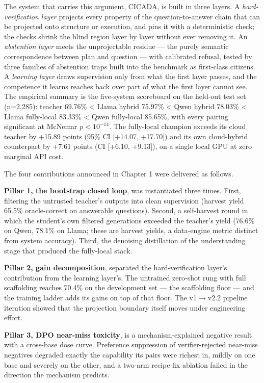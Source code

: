 \documentclass[10pt]{article} %
\begin{document}
The system that carries this argument, CICADA, is built in three layers. A \emph{hard-verification layer} projects every property of the question-to-answer chain that can be projected onto structure or execution, and pins it with a deterministic check; the checks shrink the blind region layer by layer without ever removing it. An \emph{abstention layer} meets the unprojectable residue --- the purely semantic correspondence between plan and question --- with calibrated refusal, tested by three families of abstention traps built into the benchmark as first-class citizens. A \emph{learning layer} draws supervision only from what the first layer passes, and the competence it learns reaches back over part of what the first layer cannot see. The empirical summary is the five-system scoreboard on the held-out test set (n=2,285): teacher 69.76\% < Llama hybrid 75.97\% < Qwen hybrid 78.03\% < Llama fully-local 83.33\% < Qwen fully-local 85.65\%, with every pairing significant at McNemar $p<10^{-14}$. The fully-local champion exceeds its cloud teacher by +15.89 points (95\% CI [+14.07, +17.70]) and its own cloud-hybrid counterpart by +7.61 points (CI [+6.10, +9.13]), on a single local GPU at zero marginal API cost.

The four contributions announced in Chapter 1 were delivered as follows.

\textbf{Pillar 1, the bootstrap closed loop}, was instantiated three times. First, filtering the untrusted teacher's outputs into clean supervision (harvest yield 65.5\% oracle-correct on answerable questions). Second, a self-harvest round in which the student's own filtered generations exceeded the teacher's yield (76.6\% on Qwen, 78.1\% on Llama; these are harvest yields, a data-engine metric distinct from system accuracy). Third, the denoising distillation of the understanding stage that produced the fully-local stack.

\textbf{Pillar 2, gain decomposition}, separated the hard-verification layer's contribution from the learning layer's. The untrained zero-shot rung with full scaffolding reaches 70.4\% on the development set --- the scaffolding floor --- and the training ladder adds its gains on top of that floor. The v1$\rightarrow$v2.2 pipeline iteration showed that the projection boundary itself moves under engineering effort.

\textbf{Pillar 3, DPO near-miss toxicity}, is a mechanism-explained negative result with a cross-base dose curve. Preference suppression of verifier-rejected near-miss negatives degraded exactly the capability its pairs were richest in, mildly on one base and severely on the other, and a two-arm recipe-fix ablation failed in the direction the mechanism predicts.
\end{document}
